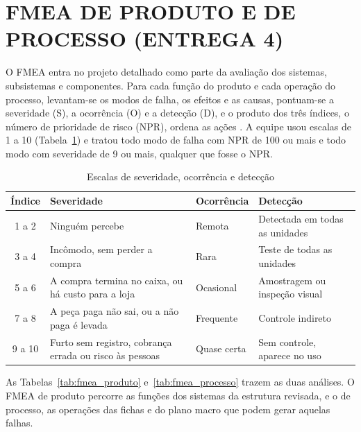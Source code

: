 \section{FMEA DE PRODUTO E DE PROCESSO (ENTREGA 4)}\label{sec:fmea}


O FMEA entra no projeto detalhado como parte da avaliação dos sistemas, subsistemas e componentes. Para cada função do produto e cada operação do processo, levantam-se os modos de falha, os efeitos e as causas, pontuam-se a severidade (S), a ocorrência (O) e a detecção (D), e o produto dos três índices, o número de prioridade de risco (NPR), ordena as ações \cite{rozenfeld2006gestao}. A equipe usou escalas de 1 a 10 (Tabela~\ref{tab:fmea_escalas}) e tratou todo modo de falha com NPR de 100 ou mais e todo modo com severidade de 9 ou mais, qualquer que fosse o NPR.

\begin{table}[htbp]
    \centering
    \caption{Escalas de severidade, ocorrência e detecção}
    \label{tab:fmea_escalas}
    \footnotesize
    \renewcommand{\arraystretch}{1.3}
    \begin{tabularx}{\textwidth}{@{}
        c
        >{\RaggedRight\arraybackslash}X
        >{\RaggedRight\arraybackslash}p{3.2cm}
        >{\RaggedRight\arraybackslash}X@{}}
        \toprule
        \textbf{Índice} & \textbf{Severidade} & \textbf{Ocorrência} & \textbf{Detecção} \\
        \midrule
        1 a 2 & Ninguém percebe & Remota & Detectada em todas as unidades \\
        3 a 4 & Incômodo, sem perder a compra & Rara & Teste de todas as unidades \\
        5 a 6 & A compra termina no caixa, ou há custo para a loja & Ocasional & Amostragem ou inspeção visual \\
        7 a 8 & A peça paga não sai, ou a não paga é levada & Frequente & Controle indireto \\
        9 a 10 & Furto sem registro, cobrança errada ou risco às pessoas & Quase certa & Sem controle, aparece no uso \\
        \bottomrule
    \end{tabularx}
\end{table}

As Tabelas~\ref{tab:fmea_produto} e~\ref{tab:fmea_processo} trazem as duas análises. O FMEA de produto percorre as funções dos sistemas da estrutura revisada, e o de processo, as operações das fichas e do plano macro que podem gerar aquelas falhas.

